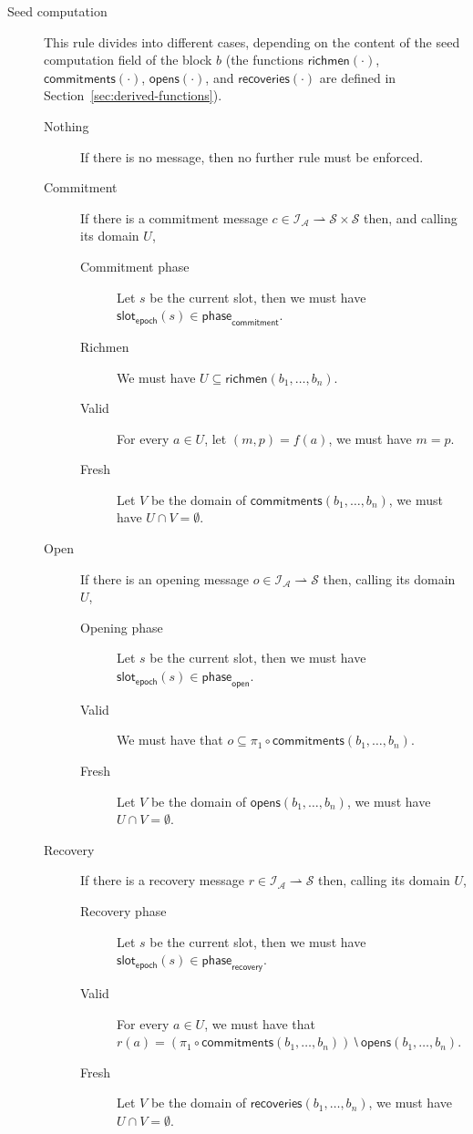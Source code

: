 \documentclass{article}
\newcommand{\idsof}[1]{\mathcal{I}\!_#1}
\newcommand{\agentids}{\idsof{\mathcal{A}}}
\newcommand{\seeds}{\mathcal{S}}
\newcommand{\epochslot}[1]{\mathsf{slot}_\mathsf{epoch}(#1)}
\newcommand{\commitphase}{\mathsf{phase}_\mathsf{commitment}}
\newcommand{\openphase}{\mathsf{phase}_\mathsf{open}}
\newcommand{\recoveryphase}{\mathsf{phase}_\mathsf{recovery}}
\newcommand{\epochcommitments}[1]{\mathsf{commitments}(#1)}
\newcommand{\epochopens}[1]{\mathsf{opens}(#1)}
\newcommand{\epochrecoveries}[1]{\mathsf{recoveries}(#1)}
\newcommand{\richmen}[1]{\mathsf{richmen}(#1)}
\begin{document}
\begin{description}
\item[Seed computation] This rule divides into different cases, depending on the
  content of the seed computation field of the block $b$ (the functions
  $\richmen{⋅}$, $\epochcommitments{⋅}$, $\epochopens{⋅}$, and
  $\epochrecoveries{⋅}$ are defined in Section~\ref{sec:derived-functions}).
  \begin{description}
  \item[Nothing] If there is no message, then no further rule must be
    enforced.
  \item[Commitment] If there is a commitment message $c ∈
    \agentids⇀\seeds×\seeds$ then, and calling its domain $U$,
    \begin{description}
    \item[Commitment phase] Let $s$ be the current slot, then we must
      have $\epochslot{s}∈\commitphase$.
    \item[Richmen] We must have $U⊆\richmen{b_1,…,b_n}$.
    \item[Valid] For every $a∈U$, let $(m,p) = f(a)$, we must have
      $m=p$.
    \item[Fresh] Let $V$ be the domain of $\epochcommitments{b_1,…,b_n}$,
      we must have $U∩V=∅$.
    \end{description}
  \item[Open] If there is an opening message $o ∈
    \agentids⇀\seeds$ then, calling its domain $U$,
    \begin{description}
    \item[Opening phase] Let $s$ be the current slot, then we must
      have $\epochslot{s}∈\openphase$.
    \item[Valid] We must have that $o ⊆ π_1 ∘
      \epochcommitments{b_1,…,b_n}$.
    \item[Fresh] Let $V$ be the domain of $\epochopens{b_1,…,b_n}$,
      we must have $U∩V=∅$.
    \end{description}
  \item[Recovery] If there is a recovery message $r ∈
    \agentids⇀\seeds$ then, calling its domain $U$,
    \begin{description}
    \item[Recovery phase] Let $s$ be the current slot, then we must
      have $\epochslot{s}∈\recoveryphase$.
    \item[Valid] For every $a∈U$, we must have that $r(a) = (π_1 ∘ \epochcommitments{b_1,…,b_n})⧵\epochopens{b_1,…,b_n}$.
    \item[Fresh] Let $V$ be the domain of $\epochrecoveries{b_1,…,b_n}$,
      we must have $U∩V=∅$.
    \end{description}

  \end{description}


\end{description}
\end{document}
